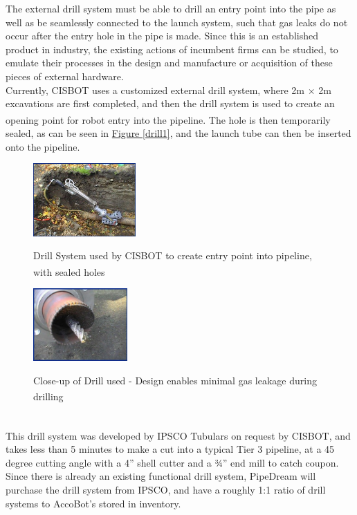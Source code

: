 \documentclass[11pt]{article}		%
\newcommand{\supercite}[1]{\textsuperscript{\cite{#1}}}		%
\newcommand{\figref}[1]{\hyperref[#1]{Figure \ref*{#1}}}    %
\begin{document}
		    The external drill system must be able to drill an entry point into the pipe as well as be seamlessly connected to the launch system, such that gas leaks do not occur after the entry hole in the pipe is made. Since this is an established product in industry, the existing actions of incumbent firms can be studied, to emulate their processes in the design and manufacture or acquisition of these pieces of external hardware.
		    \\
            \hspace*{2ex}Currently, CISBOT uses a customized external drill system, where 2m $\times$ 2m excavations are first completed, and then the drill system is used to create an opening point for robot entry into the pipeline\supercite{cisbotdrill}. The hole is then temporarily sealed, as can be seen in \figref{drill1}, and the launch tube can then be inserted onto the pipeline. 
				\begin{figure}[h]
				\centering
				\begin{multicols}{2}
				    \includegraphics[width = 0.35\textwidth]{drill1.jpg}
    				\caption{Drill System used by CISBOT to create entry point into pipeline, with sealed holes\supercite{drill1} }
    				\label{drill1}
    				\columnbreak
    				\includegraphics[width = 0.32\textwidth]{drill2.jpg}
    				\caption{Close-up of Drill used - Design enables minimal gas leakage during drilling\supercite{drill2}}
    				\label{drill2}
				\end{multicols}
			\end{figure}
			\vspace{-0.5cm}
			\\
            \hspace*{2ex}This drill system was developed by IPSCO Tubulars on request by CISBOT\supercite{IPSCO}, and takes less than 5 minutes to make a cut into a typical Tier 3 pipeline, at a 45 degree cutting angle with a 4” shell cutter and a ¾” end mill to catch coupon.
            \\
            \hspace*{2ex}Since there is already an existing functional drill system, PipeDream will purchase the drill system from IPSCO, and have a roughly 1:1 ratio of drill systems to AccoBot's stored in inventory.
            
\end{document}
